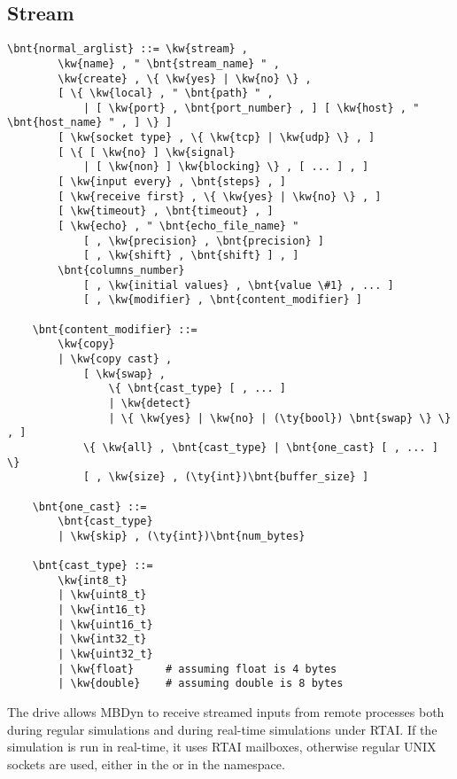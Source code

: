 \subsection{Stream}\label{sec:Stream}
\begin{Verbatim}[commandchars=\\\{\}]
    \bnt{normal_arglist} ::= \kw{stream} ,
        \kw{name} , " \bnt{stream_name} " ,
        \kw{create} , \{ \kw{yes} | \kw{no} \} ,
        [ \{ \kw{local} , " \bnt{path} " ,
            | [ \kw{port} , \bnt{port_number} , ] [ \kw{host} , " \bnt{host_name} " , ] \} ]
        [ \kw{socket type} , \{ \kw{tcp} | \kw{udp} \} , ]
        [ \{ [ \kw{no} ] \kw{signal}
            | [ \kw{non} ] \kw{blocking} \} , [ ... ] , ]
        [ \kw{input every} , \bnt{steps} , ]
        [ \kw{receive first} , \{ \kw{yes} | \kw{no} \} , ]
        [ \kw{timeout} , \bnt{timeout} , ]
        [ \kw{echo} , " \bnt{echo_file_name} "
            [ , \kw{precision} , \bnt{precision} ]
            [ , \kw{shift} , \bnt{shift} ] , ]
        \bnt{columns_number}
            [ , \kw{initial values} , \bnt{value \#1} , ... ]
            [ , \kw{modifier} , \bnt{content_modifier} ]

    \bnt{content_modifier} ::=
        \kw{copy}
        | \kw{copy cast} ,
            [ \kw{swap} ,
                \{ \bnt{cast_type} [ , ... ]
                | \kw{detect}
                | \{ \kw{yes} | \kw{no} | (\ty{bool}) \bnt{swap} \} \} , ]
            \{ \kw{all} , \bnt{cast_type} | \bnt{one_cast} [ , ... ] \}
            [ , \kw{size} , (\ty{int})\bnt{buffer_size} ]

    \bnt{one_cast} ::=
        \bnt{cast_type}
        | \kw{skip} , (\ty{int})\bnt{num_bytes}

    \bnt{cast_type} ::=
        \kw{int8_t}
        | \kw{uint8_t}
        | \kw{int16_t}
        | \kw{uint16_t}
        | \kw{int32_t}
        | \kw{uint32_t}
        | \kw{float}     # assuming float is 4 bytes
        | \kw{double}    # assuming double is 8 bytes

\end{Verbatim}
The  drive allows MBDyn to receive streamed inputs 
from remote processes both during regular simulations and during 
real-time simulations under RTAI.
If the simulation is run in real-time, it uses RTAI mailboxes, 
otherwise regular UNIX sockets are used, either in the  or 
in the  namespace.

